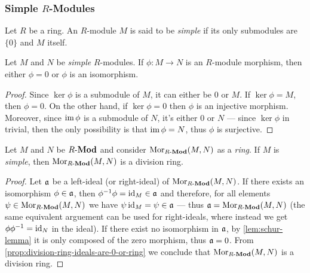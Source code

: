 \subsubsection{Simple \texorpdfstring{\(R\)}{R}-Modules}

\begin{definition}
\label{def:simple-module}
Let \(R\) be a ring. An \(R\)-module \(M\) is said to be \emph{simple} if its
only submodules are \(\{0\}\) and \(M\) itself.
\end{definition}

\begin{lemma}[Schur's]
\label{lem:schur-lemma}
Let \(M\) and \(N\) be \emph{simple} \(R\)-modules. If \(\phi: M \to N\) is an
\(R\)-module morphism, then either \(\phi = 0\) or \(\phi\) is an isomorphism.
\end{lemma}

\begin{proof}
Since \(\ker \phi\) is a submodule of \(M\), it can either be \(0\) or \(M\). If
\(\ker \phi = M\), then \(\phi = 0\). On the other hand, if \(\ker \phi = 0\)
then \(\phi\) is an injective morphism. Moreover, since \(\operatorname{im} \phi\) is a
submodule of \(N\), it's either \(0\) or \(N\) --- since \(\ker \phi\) in
trivial, then the only possibility is that \(\operatorname{im} \phi = N\), thus \(\phi\) is
surjective.
\end{proof}

\begin{corollary}
\label{cor:M-simple-Mor-division-ring}
Let \(M\) and \(N\) be \({R\text{-}\textbf{Mod}}\) and consider \(\operatorname{Mor}_{{R\text{-}\textbf{Mod}}}(M, N)\) as a
\emph{ring}. If \(M\) is \emph{simple}, then \(\operatorname{Mor}_{{R\text{-}\textbf{Mod}}}(M, N)\) is a
division ring.
\end{corollary}

\begin{proof}
Let \(\mathfrak{a}\) be a left-ideal (or right-ideal) of \(\operatorname{Mor}_{{R\text{-}\textbf{Mod}}}(M,
N)\). If there exists an isomorphism \(\phi \in \mathfrak{a}\), then
\(\phi^{-1} \phi = \operatorname{id}_M \in \mathfrak{a}\) and therefore, for all elements
\(\psi \in \operatorname{Mor}_{{R\text{-}\textbf{Mod}}}(M, N)\) we have \(\psi \operatorname{id}_M = \psi \in \mathfrak{a}\)
--- thus \(\mathfrak{a} = \operatorname{Mor}_{{R\text{-}\textbf{Mod}}}(M, N)\) (the same equivalent arguement can
be used for right-ideals, where instead we get \(\phi \phi^{-1} = \operatorname{id}_N\) in the
ideal). If there exist no isomorphism in \(\mathfrak{a}\), by
\cref{lem:schur-lemma} it is only composed of the zero morphism, thus
\(\mathfrak{a} = 0\). From \cref{prop:division-ring-ideals-are-0-or-ring} we
conclude that \(\operatorname{Mor}_{{R\text{-}\textbf{Mod}}}(M, N)\) is a division ring.
\end{proof}

